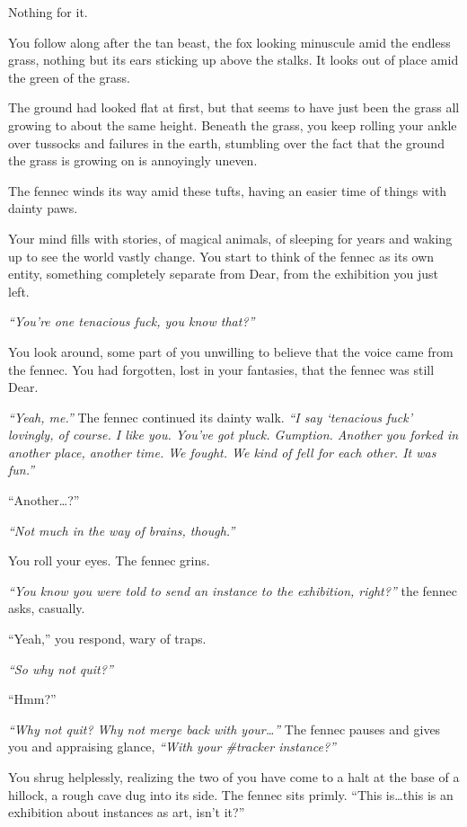Nothing for it.

You follow along after the tan beast, the fox looking minuscule amid the endless grass, nothing but its ears sticking up above the stalks. It looks out of place amid the green of the grass.

The ground had looked flat at first, but that seems to have just been the grass all growing to about the same height. Beneath the grass, you keep rolling your ankle over tussocks and failures in the earth, stumbling over the fact that the ground the grass is growing on is annoyingly uneven.

The fennec winds its way amid these tufts, having an easier time of things with dainty paws.

Your mind fills with stories, of magical animals, of sleeping for years and waking up to see the world vastly change. You start to think of the fennec as its own entity, something completely separate from Dear, from the exhibition you just left.

\emph{``You're one tenacious fuck, you know that?''}

You look around, some part of you unwilling to believe that the voice came from the fennec. You had forgotten, lost in your fantasies, that the fennec was still Dear.

\emph{``Yeah, me.''} The fennec continued its dainty walk. \emph{``I say `tenacious fuck' lovingly, of course. I like you. You've got pluck. Gumption. Another you forked in another place, another time. We fought. We kind of fell for each other. It was fun.''}

``Another\ldots{}?''

\emph{``Not much in the way of brains, though.''}

You roll your eyes. The fennec grins.

\emph{``You know you were told to send an instance to the exhibition, right?''} the fennec asks, casually.

``Yeah,'' you respond, wary of traps.

\emph{``So why not quit?''}

``Hmm?''

\emph{``Why not quit? Why not merge back with your\ldots{}''} The fennec pauses and gives you and appraising glance, \emph{``With your \#tracker instance?''}

You shrug helplessly, realizing the two of you have come to a halt at the base of a hillock, a rough cave dug into its side. The fennec sits primly. ``This is\ldots{}this is an exhibition about instances as art, isn't it?''

